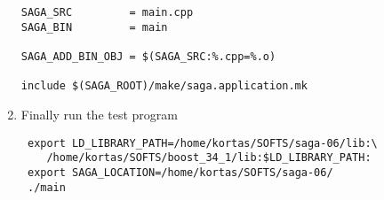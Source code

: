 \begin{enumerate}
\begin{lstlisting}
SAGA_SRC         = main.cpp
SAGA_BIN         = main

SAGA_ADD_BIN_OBJ = $(SAGA_SRC:%.cpp=%.o)

include $(SAGA_ROOT)/make/saga.application.mk
\end{lstlisting}

 \item Finally run the test program
\begin{lstlisting}
 export LD_LIBRARY_PATH=/home/kortas/SOFTS/saga-06/lib:\
	/home/kortas/SOFTS/boost_34_1/lib:$LD_LIBRARY_PATH:
 export SAGA_LOCATION=/home/kortas/SOFTS/saga-06/
 ./main
\end{lstlisting}
\end{enumerate}










